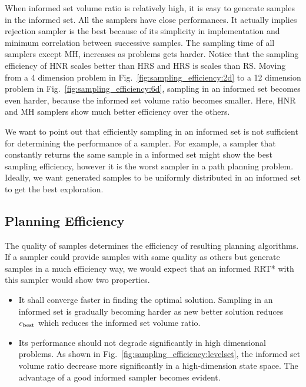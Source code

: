 \documentclass[letterpaper, 10 pt, conference]{ieeeconf}  %
\begin{document}
When informed set volume ratio is relatively high, it is easy to generate samples in the informed set.
All the samplers have close performances.
It actually implies rejection sampler is the best because of its simplicity in implementation and minimum correlation between successive samples.
The sampling time of all samplers except MH, increases as problems gets harder.
Notice that the sampling efficiency of HNR scales better than HRS and HRS is scales than RS.
Moving from a 4 dimension problem in Fig.~\ref{fig:sampling_efficiency:2d} to a 12 dimension problem in Fig.~\ref{fig:sampling_efficiency:6d}, sampling in an informed set becomes even harder, because the informed set volume ratio becomes smaller.
Here, HNR and MH samplers show much better efficiency over the others.

We want to point out that efficiently sampling in an informed set is not sufficient for determining the performance of a sampler.
For example, a sampler that constantly returns the same sample in a informed set might show the best sampling efficiency, however it is the worst sampler in a path planning problem.
Ideally, we want generated samples to be uniformly distributed in an informed set to get the best exploration.

\subsection{Planning Efficiency}

The quality of samples determines the efficiency of resulting planning algorithms.
If a sampler could provide samples with same quality as others but generate samples in a much efficiency way, we would expect that an informed RRT* with this sampler would show two properties.
\begin{itemize}
	\item It shall converge faster in finding the optimal solution.
	Sampling in an informed set is gradually becoming harder as new better solution reduces $ c_{\rm best} $ which reduces the informed set volume ratio.
	\item Its performance should not degrade significantly in high dimensional problems.
	As shown in Fig.~\ref{fig:sampling_efficiency:levelset}, the informed set volume ratio decrease more significantly in a high-dimension state space.
	The advantage of a good informed sampler becomes evident.
\end{itemize}
\end{document}
